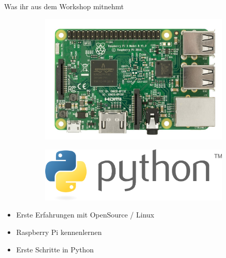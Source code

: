 \documentclass[utf8]{beamer}
\begin{document}
	\begin{frame}{Was ihr aus dem Workshop mitnehmt}
		\begin{figure}
			\begin{subfigure}{0.45\textwidth}
				\includegraphics[width=\textwidth]{img/1200px-Raspberry-Pi-3-Flat-Top.jpg}
			\end{subfigure}
			\begin{subfigure}{0.45\textwidth}
				\includegraphics[width=\textwidth]{img/Python_logo_and_wordmark200dpi.png}
			\end{subfigure}
		\end{figure}
		\begin{itemize}
			
			\item Erste Erfahrungen mit OpenSource / Linux
			\item Raspberry Pi kennenlernen
			\item Erste Schritte in Python
		\end{itemize}
	\end{frame}
	
\end{document}
